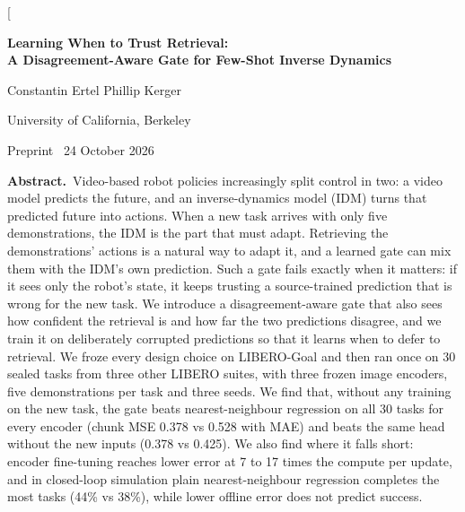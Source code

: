 \documentclass[10pt,twocolumn,letterpaper]{article}
\begin{document}
\twocolumn[{%
\begin{center}
{\sffamily\bfseries\fontsize{19}{23}\selectfont Learning When to Trust Retrieval:\\[3pt]A Disagreement-Aware Gate for Few-Shot Inverse Dynamics\par}
\vspace{12pt}
{\sffamily\large Constantin Ertel \qquad Phillip Kerger\par}
\vspace{3pt}
{\sffamily\small University of California, Berkeley\par}
\vspace{2pt}
{\sffamily\small\color{muted} Preprint \textbar\ 24 October 2026\par}
\end{center}
\vspace{6pt}
\noindent\colorbox{panel}{\parbox{\dimexpr\textwidth-2\fboxsep\relax}{\vspace{5pt}\setlength{\parindent}{0pt}\small{\sffamily\bfseries Abstract.}\ Video-based robot policies increasingly split control in two: a video model predicts the future, and an inverse-dynamics model (IDM) turns that predicted future into actions. When a new task arrives with only five demonstrations, the IDM is the part that must adapt. Retrieving the demonstrations' actions is a natural way to adapt it, and a learned gate can mix them with the IDM's own prediction. Such a gate fails exactly when it matters: if it sees only the robot's state, it keeps trusting a source-trained prediction that is wrong for the new task. We introduce a disagreement-aware gate that also sees how confident the retrieval is and how far the two predictions disagree, and we train it on deliberately corrupted predictions so that it learns when to defer to retrieval. We froze every design choice on LIBERO-Goal and then ran once on 30 sealed tasks from three other LIBERO suites, with three frozen image encoders, five demonstrations per task and three seeds. We find that, without any training on the new task, the gate beats nearest-neighbour regression on all 30 tasks for every encoder (chunk MSE 0.378 vs 0.528 with MAE) and beats the same head without the new inputs (0.378 vs 0.425). We also find where it falls short: encoder fine-tuning reaches lower error at 7 to 17 times the compute per update, and in closed-loop simulation plain nearest-neighbour regression completes the most tasks (44\% vs 38\%), while lower offline error does not predict success.\par{}\vspace{4pt}}}
}
\end{document}
